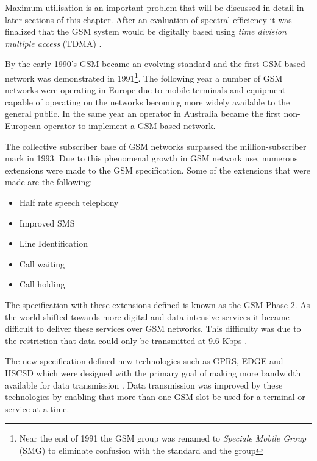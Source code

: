 Maximum utilisation is an important problem that will be discussed in detail in later sections of this chapter. After an evaluation of spectral efficiency it was finalized that the GSM system would be digitally based using \emph{time division multiple access} (TDMA) \cite{GSM92,GSMSysEngin,Eisenblatter}.

By the early 1990’s GSM became an evolving standard and the first GSM based network was demonstrated in 1991\footnote{Near the end of 1991 the GSM group was renamed to \emph{Speciale Mobile Group} (SMG) to eliminate confusion with the standard and the group}\cite{Karen2004,GSM92,GSMArchitectureProtocolsServices,Eisenblatter}. The following year a number of GSM networks were operating in Europe due to mobile terminals and equipment capable of operating on the networks becoming more widely available to the general public\cite{Karen2004,GSM92,GSMArchitectureProtocolsServices,Eisenblatter}. In the same year an operator in Australia became the first non-European operator to implement a GSM based network\cite{Eisenblatter}.

The collective subscriber base of GSM networks surpassed the million-subscriber mark in 1993. Due to this phenomenal growth in GSM network use, numerous extensions were made to the GSM specification. 
Some of the extensions that were made are the following\cite{Karen2004,GSM92,GSMArchitectureProtocolsServices,Eisenblatter}:
\begin{itemize}
\item Half rate speech telephony
\item Improved SMS
\item Line Identification
\item Call waiting
\item Call holding
\end{itemize}
The specification with these extensions defined is known as the GSM Phase 2. As the world shifted towards more digital and data intensive services it became difficult to deliver these services over GSM networks. This difficulty was due to the restriction that data could only be transmitted at 9.6 Kbps \cite{GSM92,Karen2004}.

The new specification defined new technologies such as GPRS, EDGE and HSCSD which were designed with the primary goal of making more bandwidth available for data transmission \cite{GSMArchitectureProtocolsServices,Karen2004}. Data transmission was improved by these technologies by enabling that more than one GSM slot be used for a terminal or service at a time\cite{GSMArchitectureProtocolsServices,Karen2004}.

